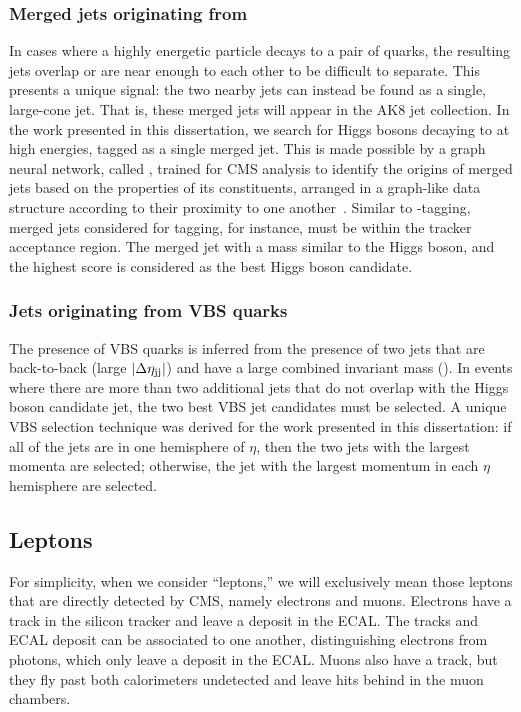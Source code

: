\subsubsection{Merged jets originating from \Htobb}
In cases where a highly energetic particle decays to a pair of quarks, the resulting jets overlap or are near enough to each other to be difficult to separate. 
This presents a unique signal: the two nearby jets can instead be found as a single, large-cone jet. 
That is, these merged jets will appear in the AK8 jet collection. 
In the work presented in this dissertation, we search for Higgs bosons decaying to \bbbar at high energies, tagged as a single merged jet. 
This is made possible by a graph neural network, called \ParticleNet, trained for CMS analysis to identify the origins of merged jets based on the properties of its constituents, arranged in a graph-like data structure according to their proximity to one another~\cite{Qu:2019gqs}. 
Similar to \Pb-tagging, merged jets considered for \Xtobb tagging, for instance, must be within the tracker acceptance region. 
The merged jet with a mass similar to the Higgs boson, and the highest \ParticleNet \Xtobb score is considered as the best Higgs boson candidate.

\subsubsection{Jets originating from VBS quarks}\label{sec:vbsjets}
The presence of VBS quarks is inferred from the presence of two jets that are back-to-back (large $\lvert \Delta\eta_{\mathrm{j}\mathrm{j}} \rvert$) and have a large combined invariant mass (\Mjj). 
In events where there are more than two additional jets that do not overlap with the Higgs boson candidate jet, the two best VBS jet candidates must be selected. 
A unique VBS selection technique was derived for the work presented in this dissertation: 
if all of the jets are in one hemisphere of $\eta$, then the two jets with the largest momenta are selected; 
otherwise, the jet with the largest momentum in each $\eta$ hemisphere are selected. 

\subsection{Leptons}
For simplicity, when we consider ``leptons,'' we will exclusively mean those leptons that are directly detected by CMS, namely electrons and muons. 
Electrons have a track in the silicon tracker and leave a deposit in the ECAL. 
The tracks and ECAL deposit can be associated to one another, distinguishing electrons from photons, which only leave a deposit in the ECAL. 
Muons also have a track, but they fly past both calorimeters undetected and leave hits behind in the muon chambers. 

